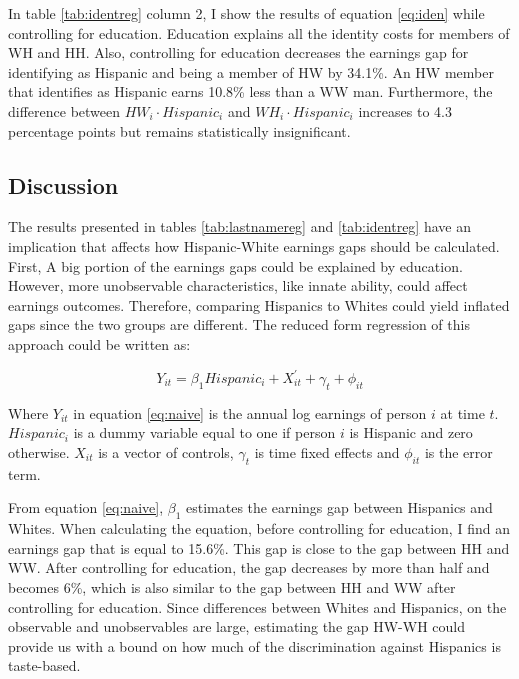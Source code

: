 \documentclass[12pt, fullpage]{article}
\begin{document}
In table  \ref{tab:identreg} column 2, I show the results of equation \ref{eq:iden} while controlling for education. Education explains all the identity costs for members of WH and HH. Also, controlling for education decreases the earnings gap for identifying as Hispanic and being a member of HW by 34.1\%. An HW member that identifies as Hispanic earns 10.8\% less than a WW man. Furthermore, the difference between $HW_{i} \cdot Hispanic_{i}$  and $WH_{i} \cdot Hispanic_{i}$ increases to 4.3 percentage points but remains statistically insignificant.
\subsection{Discussion}
 
 The results presented in tables \ref{tab:lastnamereg} and \ref{tab:identreg} have an implication that affects how Hispanic-White earnings gaps should be calculated. First, A big portion of the earnings gaps could be explained by education. However, more unobservable characteristics, like innate ability, could affect earnings outcomes. Therefore, comparing Hispanics to Whites could yield inflated gaps since the two groups are different. The reduced form regression of this approach could be written as:
 
 \begin{equation} \label{eq:naive}
 Y_{it} = \beta_{1} Hispanic_{i} + X_{it}^{\prime} + \gamma_{t}+\phi_{it}
 \end{equation}
 
 Where $Y_{it}$ in equation \ref{eq:naive} is the annual log earnings of person $i$ at time $t$. $Hispanic_{i}$ is a dummy variable equal to one if person $i$ is Hispanic and zero otherwise. $X_{it}$ is a vector of controls, $\gamma_{t}$ is time fixed effects and $\phi_{it}$ is the error term.
 
 From equation \ref{eq:naive}, $\beta_{1}$ estimates the earnings gap between Hispanics and Whites. When calculating the equation, before controlling for education, I find an earnings gap that is equal to 15.6\%. This gap is close to the gap between HH and WW. After controlling for education, the gap decreases by more than half and becomes 6\%, which is also similar to the gap between HH and WW after controlling for education. Since differences between Whites and Hispanics, on the observable and unobservables are large, estimating the gap HW-WH could provide us with a bound on how much of the discrimination against Hispanics is taste-based. 
 
\end{document}
